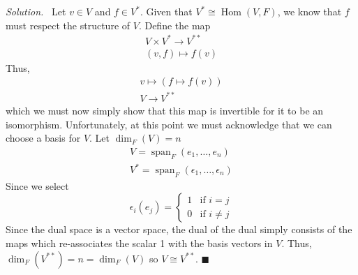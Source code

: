 \documentclass[11pt]{article}
\theoremstyle{plain}
\theoremstyle{definition}
\newenvironment{solution}{%
  \par\noindent\textit{Solution.}\
}{%
  \hfill$\blacksquare$\par\bigskip
}
\newcommand{\Hom}{\operatorname{Hom}}
\newcommand{\Span}{\operatorname{span}}
\newcommand{\Dim}{\operatorname{dim}}
\newcommand{\dual}[1]{#1^{\ast}}
\begin{document}
\begin{solution}
  Let \( v\in V \) and \( f\in V^* \). Given that \( V^*\cong \Hom(V,
  F) \), we know that \( f \) must respect the structure of \( V \).
  Define the map
  \[
    \begin{matrix}
      V \times \dual{V} \to V^{**} \\
      (v, f) \mapsto f(v)
    \end{matrix}
  \]
  Thus,
  \[
    \begin{matrix}
      v\mapsto(f\mapsto f(v)) \\
      V\to V^{ ** }
    \end{matrix}
  \]
  which we must now simply show that this map is invertible for it to
  be an isomorphism. Unfortunately, at this point we must acknowledge
  that we can choose a basis for \( V \). Let \( \dim_F(V) = n\)
  \[
    \begin{matrix}
      V=\Span_F(e_1, \dots, e_n) \\
      V^*=\Span_F(\epsilon_1, \dots, \epsilon_n)
    \end{matrix}
  \]
  Since we select
  \[
    \epsilon_i(e_j)=
    \begin{cases}1 & \text{if } i=j \\ 0 & \text{if } i\neq j
    \end{cases}
  \]
  Since the dual space is a vector space, the dual of the dual simply
  consists of the maps which re-associates the scalar 1
  with the basis vectors in \( V \). Thus, \(
  \Dim_F(V^{**})=n=\Dim_F(V) \) so \( V\cong V^{**} \).
\end{solution}
\end{document}
